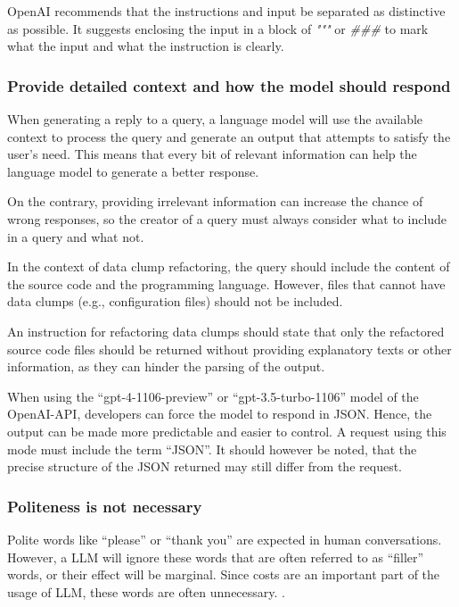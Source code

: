 OpenAI recommends that the instructions and input be separated as distinctive as possible. It suggests enclosing the input in a block of \textit{"""} or \textit{\#\#\#} to mark what the input and what the instruction is clearly.

\subsubsection{Provide detailed context and how the model should respond}

When generating a reply to a query, a language model will use the available context to process the query and generate an output that attempts to satisfy the user's need. This means that every bit of relevant information can help the language model to generate a better response.

On the contrary, providing irrelevant information can increase the chance of wrong responses, so the creator of a query must always consider what to include in a query and what not. 

In the context of data clump refactoring, the query should include the content of the source code and the programming language. However, files that cannot have data clumps (e.g., configuration files) should not be included.

An instruction for refactoring data clumps should state that only the refactored source code files should be returned without providing explanatory texts or other information, as they can hinder the parsing of the output. 

When using the \enquote{gpt-4-1106-preview} or \enquote{gpt-3.5-turbo-1106} model of the OpenAI-\ac{API}, developers can force the model to respond in \ac{JSON}. Hence, the output can be made more predictable and easier to control. A request using this mode must include the term \enquote{\ac{JSON}}. It should however be noted, that the precise structure of the \ac{JSON} returned may still differ from the request. 

\subsubsection{Politeness is not necessary}

Polite words like \enquote{please} or \enquote{thank you} are expected in human conversations. However, a  \ac{LLM} will ignore these words that are often referred to as \enquote{filler} words, or their effect will be marginal. Since costs are an important part of the usage of \ac{LLM}, these words are often unnecessary. \cite{bsharat2023principled}.

